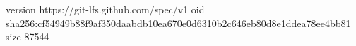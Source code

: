 version https://git-lfs.github.com/spec/v1
oid sha256:cf54949b88f9af350daabdb10ea670e0d6310b2c646eb80d8e1ddea78ee4bb81
size 87544
